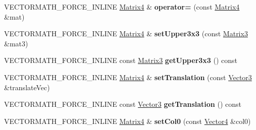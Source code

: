 \begin{DoxyCompactItemize}
\mbox{\label{classVectormath_1_1Aos_1_1Matrix4_a267c74e0e3314b54ae0494c8de619736}} 
V\+E\+C\+T\+O\+R\+M\+A\+T\+H\+\_\+\+F\+O\+R\+C\+E\+\_\+\+I\+N\+L\+I\+NE \hyperlink{classVectormath_1_1Aos_1_1Matrix4}{Matrix4} \& {\bfseries operator=} (const \hyperlink{classVectormath_1_1Aos_1_1Matrix4}{Matrix4} \&mat)
\item 
\mbox{\label{classVectormath_1_1Aos_1_1Matrix4_ac8290f5943fc0500bb973deabbb73763}} 
V\+E\+C\+T\+O\+R\+M\+A\+T\+H\+\_\+\+F\+O\+R\+C\+E\+\_\+\+I\+N\+L\+I\+NE \hyperlink{classVectormath_1_1Aos_1_1Matrix4}{Matrix4} \& {\bfseries set\+Upper3x3} (const \hyperlink{classVectormath_1_1Aos_1_1Matrix3}{Matrix3} \&mat3)
\item 
\mbox{\label{classVectormath_1_1Aos_1_1Matrix4_a5395284a648385b1dd9a466b455bbcaf}} 
V\+E\+C\+T\+O\+R\+M\+A\+T\+H\+\_\+\+F\+O\+R\+C\+E\+\_\+\+I\+N\+L\+I\+NE const \hyperlink{classVectormath_1_1Aos_1_1Matrix3}{Matrix3} {\bfseries get\+Upper3x3} () const
\item 
\mbox{\label{classVectormath_1_1Aos_1_1Matrix4_afb83fc4a106bfdb32230e64e9375b35f}} 
V\+E\+C\+T\+O\+R\+M\+A\+T\+H\+\_\+\+F\+O\+R\+C\+E\+\_\+\+I\+N\+L\+I\+NE \hyperlink{classVectormath_1_1Aos_1_1Matrix4}{Matrix4} \& {\bfseries set\+Translation} (const \hyperlink{classVectormath_1_1Aos_1_1Vector3}{Vector3} \&translate\+Vec)
\item 
\mbox{\label{classVectormath_1_1Aos_1_1Matrix4_a049921b158219a1c88ae392356cf3674}} 
V\+E\+C\+T\+O\+R\+M\+A\+T\+H\+\_\+\+F\+O\+R\+C\+E\+\_\+\+I\+N\+L\+I\+NE const \hyperlink{classVectormath_1_1Aos_1_1Vector3}{Vector3} {\bfseries get\+Translation} () const
\item 
\mbox{\label{classVectormath_1_1Aos_1_1Matrix4_add6600aae59dfa0cd9bd58f2fe27d7c3}} 
V\+E\+C\+T\+O\+R\+M\+A\+T\+H\+\_\+\+F\+O\+R\+C\+E\+\_\+\+I\+N\+L\+I\+NE \hyperlink{classVectormath_1_1Aos_1_1Matrix4}{Matrix4} \& {\bfseries set\+Col0} (const \hyperlink{classVectormath_1_1Aos_1_1Vector4}{Vector4} \&col0)
\item 
\mbox{\label{classVectormath_1_1Aos_1_1Matrix4_a2367d8148278b125ceea6603743e2b43}} 

\end{DoxyCompactItemize}
